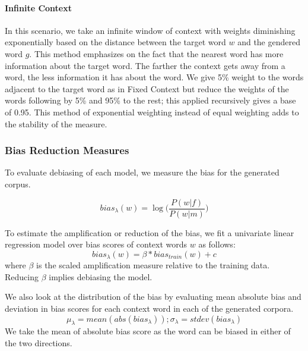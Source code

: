 \documentclass[11pt,a4paper]{article}
\newcommand{\note}[4][]{\todo[author=#2,color=#3,size=\scriptsize,fancyline,caption={},#1]{#4}} %
\newcommand{\phu}[2][]{\note[#1]{Phu}{violet!40}{#2}}
\begin{document}
\paragraph{Infinite Context} In this scenario, we take an infinite window of context with weights diminishing exponentially based on the distance between the target word $w$ and the gendered word $g$. This method emphasizes on the fact that the nearest word has more information about the target word. The farther the context gets away from a word, the less information it has about the word. We give 5\% weight to the words adjacent to the target word as in Fixed Context but reduce the weights of the words following by 5\% and 95\% to the rest; this applied recursively gives a base of 0.95. This method of exponential weighting instead of equal weighting adds to the stability of the measure.



\subsubsection{Bias Reduction Measures}
To evaluate debiasing of each model, we measure the bias for the generated corpus. 

$$bias_{\lambda}(w) = \log({\frac{P(w|f)}{P(w|m)})}
$$

To estimate the amplification or reduction of the bias, we fit a univariate linear regression model over bias scores of context words $w$ as follows:
$$
bias_{\lambda}(w)  = {\beta}*bias_{train}(w)+c
$$
where $\beta$ is the scaled amplification  measure relative to the training data. Reducing $\beta$ implies debiasing the model.

We also look at the distribution of the bias by evaluating mean absolute bias and deviation in bias scores for each context word in each of the generated corpora. 
$$
\mu_{\lambda} = mean(abs({bias_{\lambda}}))
; \sigma_{\lambda} = stdev({bias_{\lambda}})
$$
We take the mean of absolute bias score as the word can be biased in either of the two directions. %
\end{document}
